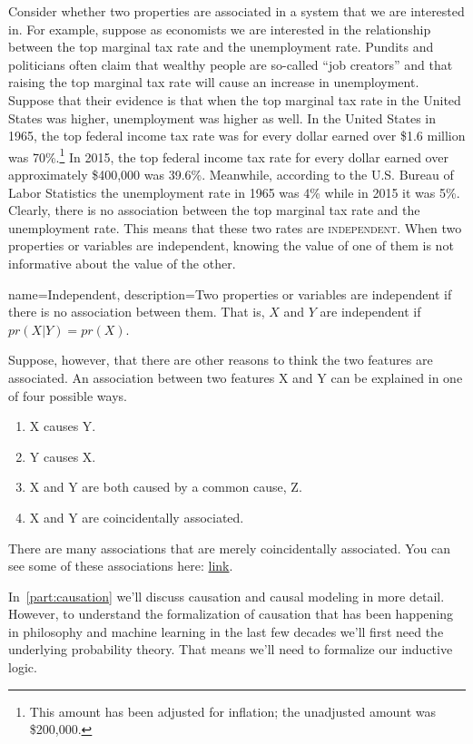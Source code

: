 Consider whether two properties are associated in a system that we are interested in. For example, suppose as economists we are interested in the relationship between the top marginal tax rate and the unemployment rate. Pundits and politicians often claim that wealthy people are so-called ``job creators'' and that raising the top marginal tax rate will cause an increase in unemployment. Suppose that their evidence is that when the top marginal tax rate in the United States was higher, unemployment was higher as well. In the United States in 1965, the top federal income tax rate was for every dollar earned over \$1.6 million was 70\%.\footnote{This amount has been adjusted for inflation; the unadjusted amount was \$200,000.} In 2015, the top federal income tax rate for every dollar earned over approximately \$400,000 was 39.6\%. Meanwhile, according to the U.S. Bureau of Labor Statistics the unemployment rate in 1965 was 4\% while in 2015 it was 5\%. Clearly, there is no association between the top marginal tax rate and the unemployment rate. This means that these two rates are \textsc{\gls{independent}}. When two properties or variables are independent, knowing the value of one of them is not informative about the value of the other.

{
name=Independent,
description={Two properties or variables are independent if there is no association between them. That is, $X$ and $Y$ are independent if $pr(X|Y)=pr(X)$.}
}

Suppose, however, that there are other reasons to think the two features are associated. An association between two features X and Y can be explained in one of four possible ways.

\begin{enumerate}
\item X causes Y.
\item Y causes X.
\item X and Y are both caused by a common cause, Z.
\item X and Y are coincidentally associated.
\end{enumerate}

There are many associations that are merely coincidentally associated. You can see some of these associations here: \href{https://www.tylervigen.com/spurious-correlations}{link}.

In~\ref{part:causation} we'll discuss causation and causal modeling in more detail. However, to understand the formalization of causation that has been happening in philosophy and machine learning in the last few decades we'll first need the underlying probability theory. That means we'll need to formalize our inductive logic.







